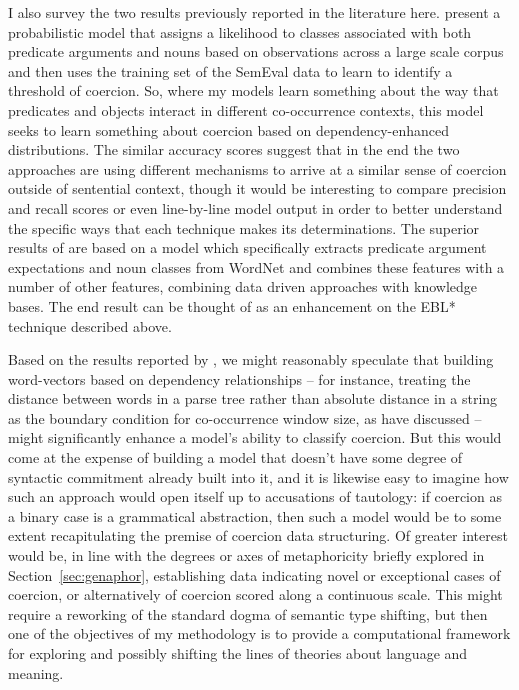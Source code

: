 I also survey the two results previously reported in the literature here.  \cite{RobertsEA2011} present a probabilistic model that assigns a likelihood to classes associated with both predicate arguments and nouns based on observations across a large scale corpus and then uses the training set of the SemEval data to learn to identify a threshold of coercion.  So, where my models learn something about the way that predicates and objects interact in different co-occurrence contexts, this model seeks to learn something about coercion based on dependency-enhanced distributions.  The similar accuracy scores suggest that in the end the two approaches are using different mechanisms to arrive at a similar sense of coercion outside of sentential context, though it would be interesting to compare precision and recall scores or even line-by-line model output in order to better understand the specific ways that each technique makes its determinations.  The superior results of \cite{RobertsEA2010} are based on a model which specifically extracts predicate argument expectations and noun classes from WordNet and combines these features with a number of other features, combining data driven approaches with knowledge bases.  The end result can be thought of as an enhancement on the \textsc{EBL*} technique described above.

Based on the results reported by \cite{RobertsEA2011}, we might reasonably speculate that building word-vectors based on dependency relationships -- for instance, treating the distance between words in a parse tree rather than absolute distance in a string as the boundary condition for co-occurrence window size, as \cite{PadoEA2007} have discussed -- might significantly enhance a model's ability to classify coercion.  But this would come at the expense of building a model that doesn't have some degree of syntactic commitment already built into it, and it is likewise easy to imagine how such an approach would open itself up to accusations of tautology: if coercion as a binary case is a grammatical abstraction, then such a model would be to some extent recapitulating the premise of coercion data structuring.  Of greater interest would be, in line with the degrees or axes of metaphoricity briefly explored in Section~\ref{sec:genaphor}, establishing data indicating novel or exceptional cases of coercion, or alternatively of coercion scored along a continuous scale.  This might require a reworking of the standard dogma of semantic type shifting, but then one of the objectives of my methodology is to provide a computational framework for exploring and possibly shifting the lines of theories about language and meaning.

